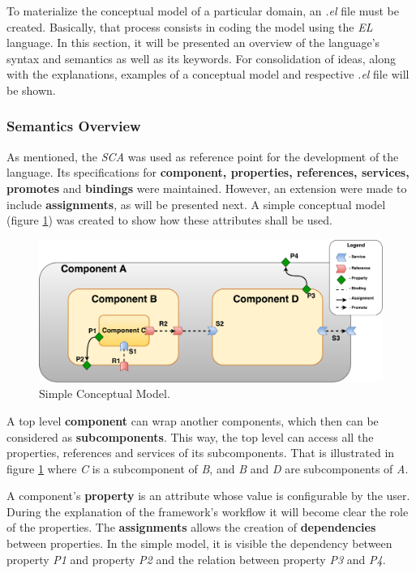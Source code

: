 To materialize the conceptual model of a particular domain, an \textit{.el} file must be created. Basically, that process consists in coding the model using the \textit{EL} language. In this section, it will be presented an overview of the language's syntax and semantics as well as its keywords. For consolidation of ideas, along with the explanations, examples of a conceptual model and respective \textit{.el} file will be shown.

\subsubsection{Semantics Overview}

As mentioned, the \textit{SCA} was used as reference point for the development of the language. Its specifications for \textbf{component, properties, references, services, promotes} and \textbf{bindings} were maintained. However, an extension were made to include \textbf{assignments}, as will be presented next. A simple conceptual model (figure \ref{fig:ModelExample}) was created to show how these attributes shall be used.

\begin{figure}[H]
\centering
\includegraphics[scale=0.25]{images/ModelExample}
\caption{Simple Conceptual Model.}
\label{fig:ModelExample} 
\end{figure}

A top level \textbf{component} can wrap another components, which then can be considered as \textbf{subcomponents}. This way, the top level can access all the properties, references and services of its subcomponents. That is illustrated in figure \ref{fig:ModelExample} where \textit{C} is a subcomponent of \textit{B}, and \textit{B} and \textit{D} are subcomponents of \textit{A}.

A component's \textbf{property} is an attribute whose value is configurable by the user. During the explanation of the framework's workflow it will become clear the role of the properties. The \textbf{assignments} allows the creation of \textbf{dependencies} between properties. In the simple model, it is visible the dependency between property \textit{P1} and property \textit{P2} and the relation between property \textit{P3} and \textit{P4}.


